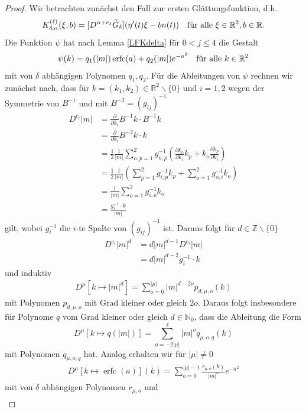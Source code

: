 \documentclass[12pt,a4paper]{scrartcl}
\numberwithin{equation}{section}
\newcommand{\R}{\mathbb{R}} %
\newcommand{\Z}{\mathbb{Z}} %
\newcommand{\N}{\mathbb{N}} %
\newcommand{\erfc}{\operatorname{erfc}}
\newcommand{\fa}{\text{\quad für alle }}
\begin{document}
\begin{proof}
Wir betrachten zunächst den Fall zur ersten Glättungsfunktion, d.h.
\[
K_{\delta,\alpha}^{(\ell)}(\xi,b)=[D^{\alpha+e_\ell}\widetilde{G}_\delta](\eta'(t) \xi - b n(t)) \fa \xi \in \R^2, b\in \R.
\]
Die Funktion $\psi$ hat nach Lemma \ref{LFKdelta} für $0<j\leq 4$ die Gestalt
\begin{align} \label{EqPsi}
\psi(k)= q_1(|m|)\erfc(a)+q_2(|m|)e^{-a^2} \fa k \in \R^2
\end{align}
mit von $\delta$ abhängigen Polynomen $q_1,q_2$. 
Für die Ableitungen von $\psi$ rechnen wir zunächst nach, dass für $k=(k_1,k_2)\in \R^2 \backslash \{0\}$ und $i=1,2$ wegen der Symmetrie von $B^{-1}$ und mit $B^{-2}=(g_{ij})^{-1}$
\begin{align*}
D^{e_i} |m| 
&= \frac{\partial}{\partial k_i} B^{-1} k \cdot B^{-1} k \\
&= \frac{\partial}{\partial k_i} B^{-2} k \cdot  k \\
&= \frac{1}{2}\frac{1}{|m|} \sum_{o,p=1}^2 g_{o,p}^{-1}\left( \frac{\partial k_o}{\partial k_i} k_p + k_o \frac{\partial k_p}{\partial k_i} \right) \\
&= \frac{1}{2}\frac{1}{|m|} \left(\sum_{p=1}^2 g_{i,p}^{-1}k_p + \sum_{o=1}^2 g_{o,i}^{-1}k_o \right)  \\
&=\frac{1}{|m|}\sum_{o=1}^2 g_{i,o}^{-1} k_o \\
&= \frac{g_i^{-1}\cdot k}{|m|}
\end{align*}
 gilt, wobei $g_i^{-1}$ die $i$-te Spalte von $(g_{ij})^{-1}$ ist. Daraus folgt für $d \in \Z\backslash \{0\}$
\begin{align*}
D^{e_i} |m|^d
&= d |m|^{d-1} D^{e_i} |m| \\ 
&= d |m|^{d-2} g_i^{-1} \cdot k
\end{align*} und induktiv
\begin{align*}
D^\mu \left[k \mapsto |m|^d \right] = \sum_{o=0}^{|\mu|}|m|^{d-2o}p_{d,\mu,o}(k)
\end{align*}
mit Polynomen $p_{d,\mu,o}$ mit Grad kleiner oder gleich $2o$. Daraus folgt insbesondere für Polynome $q$ vom Grad kleiner oder gleich $d \in \N_0$, dass die Ableitung die Form 
\[
D^\mu [k \mapsto q(|m|)] = \sum_{o=-2|\mu|}^{\ell} |m|^o q_{\mu,o,q}(k) 
\]
mit Polynomen $q_{\mu,o,q}$ hat. Analog erhalten wir für $|\mu|\neq 0$
\begin{align}\label{EqDerfc}
D^\mu [k \mapsto \erfc(a)](k)= \sum_{o=0}^{|\mu|-1} \frac{r_{\mu,o}(k)}{|m|^o} e^{-a^2}
\end{align} mit von $\delta$ abhängigen Polynomen $r_{\mu,o}$ und
\begin{align}\label{EqDexp}

\end{align}
\end{proof}
\end{document}
